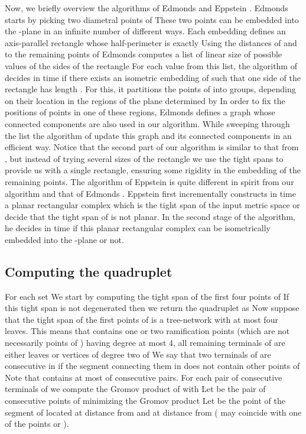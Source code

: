 \documentclass[11pt]{amsart}
\begin{document}
Now, we briefly overview the algorithms of Edmonds \cite{Ed} and
Eppstein \cite{Epp}. Edmonds \cite{Ed} starts by picking two
diametral points  of  These two points can be embedded into
the -plane in an infinite number of different ways. Each
embedding defines  an axis-parallel rectangle   whose
half-perimeter  is exactly  Using the distances of  and
 to the remaining points of  Edmonds computes a list 
of linear size of possible values of the sides of the rectangle
 For each value  from this list, the algorithm of
\cite{Ed} decides in  time if there exists an isometric
embedding of  such that one side of the rectangle  has
length . For this, it partitions the points of  into
groups, depending on their location in the regions of the plane
determined by  In order to fix the positions of points in one
of these regions, Edmonds \cite{Ed} defines a graph whose connected
components are also used  in our algorithm. While sweeping through
the list  the algorithm of \cite{Ed} update this graph and
its connected components in an efficient way. Notice that the second
part of our algorithm is similar to that from \cite{Ed}, but
instead of trying several sizes of the rectangle  we use the
tight spans to provide us with a single rectangle, ensuring some
rigidity in the embedding of the remaining  points. The algorithm of
Eppstein \cite{Epp} is quite different in spirit from our algorithm
and that of Edmonds \cite{Ed}. Eppstein \cite{Epp} first
incrementally constructs  in  time a planar rectangular
complex which is the tight span of the input metric space  or
decide that the tight span of  is not planar. In the second stage
of the algorithm, he decides in  time if this planar
rectangular complex can be isometrically embedded into the
-plane or not.


\subsection{Computing the quadruplet }\label{Pcirc} For each  set  We start by computing the tight span of the first four points of  If this tight span is not degenerated then we return the quadruplet  as  Now suppose that the tight span of the first  points of  is a tree-network 
with at most four leaves. This means that  contains one or two ramification points (which are not necessarily points of ) having degree at most 4,
all remaining terminals of  are either leaves or vertices of degree two of  We say that two terminals of  are consecutive in 
if the segment connecting them in  does not contain other points of  Note that  contains  at most  of consecutive
pairs. For each pair  of consecutive terminals of  we compute the Gromov product  of  with  Let  be the pair of consecutive points of  minimizing the Gromov product  Let  be the point of the segment  of  located at distance  from  and at distance  from  ( may coincide with one of the points  or ).
\end{document}
